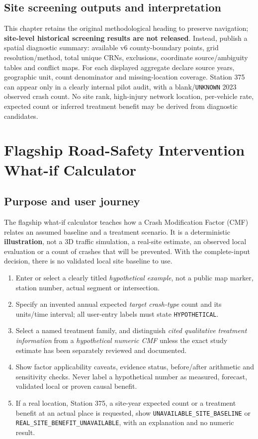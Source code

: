 \documentclass[11pt,a4paper,openany]{report}
\newcommand{\pathcode}[1]{\nolinkurl{#1}}
\begin{document}
\section{Site screening outputs and interpretation}
This chapter retains the original methodological heading to preserve navigation; \textbf{site-level historical screening results are not released}. Instead, publish a spatial diagnostic summary: available v6 county-boundary points, grid resolution/method, total unique CRNs, exclusions, coordinate source/ambiguity tables and conflict maps. For each displayed aggregate declare source years, geographic unit, count denominator and missing-location coverage. Station 375 can appear only in a clearly internal pilot audit, with a blank/\pathcode{UNKNOWN} 2023 observed crash count. No site rank, high-injury network location, per-vehicle rate, expected count or inferred treatment benefit may be derived from diagnostic candidates.

\chapter{Flagship Road-Safety Intervention What-if Calculator}
\section{Purpose and user journey}
The flagship what-if calculator teaches how a Crash Modification Factor (CMF) relates an assumed baseline and a treatment scenario. It is a deterministic \textbf{illustration}, not a 3D traffic simulation, a real-site estimate, an observed local evaluation or a count of crashes that will be prevented. With the complete-input decision, there is no validated local site baseline to use.
\begin{enumerate}
\item Enter or select a clearly titled \emph{hypothetical example}, not a public map marker, station number, actual segment or intersection.
\item Specify an invented annual expected \emph{target crash-type} count and its units/time interval; all user-entry labels must state \pathcode{HYPOTHETICAL}.
\item Select a named treatment family, and distinguish \emph{cited qualitative treatment information} from a \emph{hypothetical numeric CMF} unless the exact study estimate has been separately reviewed and documented.
\item Show factor applicability caveats, evidence status, before/after arithmetic and sensitivity checks. Never label a hypothetical number as measured, forecast, validated local or proven causal benefit.
\item If a real location, Station 375, a site-year expected count or a treatment benefit at an actual place is requested, show \pathcode{UNAVAILABLE_SITE_BASELINE} or \pathcode{REAL_SITE_BENEFIT_UNAVAILABLE}, with an explanation and no numeric result.
\end{enumerate}
\end{document}
